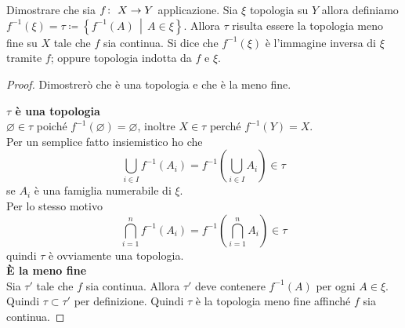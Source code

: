 \begin{theorem}
	Dimostrare che sia $f \colon\ X \rightarrow Y$ applicazione. Sia $\xi$ topologia su $Y$ allora definiamo $f^{-1}(\xi) = \tau \coloneqq \left\{f^{-1}(A) \,\middle|\, A \in \xi \right\}$. Allora $\tau$ risulta essere la topologia meno fine su $X$ tale che $f$ sia continua. Si dice che $f^{-1}(\xi)$ è l'immagine inversa di $\xi$ tramite $f$; oppure topologia indotta da $f$ e $\xi$.
\end{theorem}
\begin{proof}
	Dimostrerò che è una topologia e che è la meno fine.
	
	\textbf{$\tau$ è una topologia}\\
	
	$\varnothing \in \tau$ poiché $f^{-1}(\varnothing) = \varnothing$, inoltre $X \in \tau$ perché $f^{-1}(Y) = X$. \\
	Per un semplice fatto insiemistico ho che 
	\begin{equation*}
		\bigcup_{i \in I} f^{-1}(A_i) = f^{-1}\left(\bigcup_{i \in I} A_i\right) \in \tau 
	\end{equation*}
	se $A_i$ è una famiglia numerabile di $\xi$.\\
	Per lo stesso motivo
	\begin{equation*}
			\bigcap^n_{i=1} f^{-1}(A_i) = f^{-1}\left(\bigcap^{n}_{i=1} A_i\right) \in \tau
	\end{equation*}
	quindi $\tau$ è ovviamente una topologia.\\
	
	\textbf{È la meno fine}\\
	
	Sia $\tau'$ tale che $f$ sia continua. Allora $\tau'$ deve contenere $f^{-1}(A)$ per ogni $A\in \xi$. Quindi $\tau \subset \tau'$ per definizione. Quindi $\tau$ è la topologia meno fine affinché $f$ sia continua.
\end{proof}

